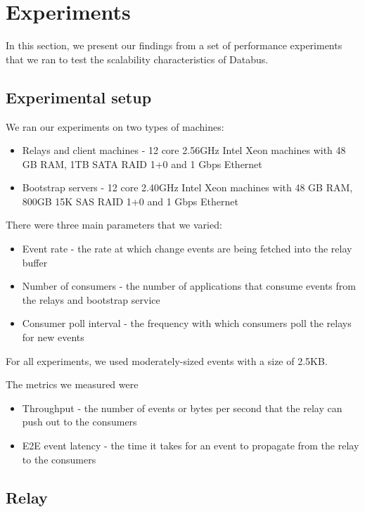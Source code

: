 \section{Experiments}

In this section, we present our findings from a set of performance experiments that we ran to test the scalability characteristics of Databus. 

\subsection{Experimental setup}

We ran our experiments on two types of machines:

\begin{itemize}
\item Relays and client machines - 12 core 2.56GHz Intel Xeon machines with 48 GB RAM, 1TB SATA RAID 1+0 and 1 Gbps Ethernet
\item Bootstrap servers - 12 core 2.40GHz Intel Xeon machines with 48 GB RAM, 800GB 15K SAS RAID 1+0 and 1 Gbps Ethernet
\end{itemize}

There were three main parameters that we varied:

\begin{itemize}
\item Event rate - the rate at which change events are being fetched into the relay buffer
\item Number of consumers - the number of applications that consume events from the relays and bootstrap service
\item Consumer poll interval - the frequency with which consumers poll the relays for new events
\end{itemize}

For all experiments, we used moderately-sized events with a size of 2.5KB.

The metrics we measured were

\begin{itemize}
\item Throughput - the number of events or bytes per second that the relay can push out to the consumers
\item E2E event latency - the time it takes for an event to propagate from the relay to the consumers
\end{itemize}

\subsection{Relay}

